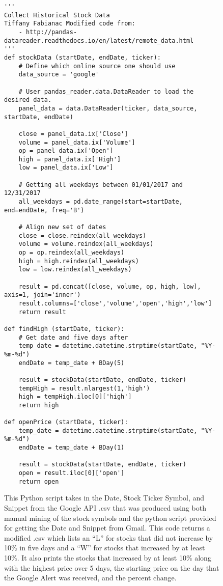 \documentclass[sigconf]{acmart}
\begin{document}
\begin{figure}[htb]
\begin{verbatim}
'''
Collect Historical Stock Data
Tiffany Fabianac Modified code from:
    - http://pandas-datareader.readthedocs.io/en/latest/remote_data.html
'''
def stockData (startDate, endDate, ticker):
	# Define which online source one should use
	data_source = 'google'

	# User pandas_reader.data.DataReader to load the desired data.
	panel_data = data.DataReader(ticker, data_source, startDate, endDate)

	close = panel_data.ix['Close']
	volume = panel_data.ix['Volume']
	op = panel_data.ix['Open']
	high = panel_data.ix['High']
	low = panel_data.ix['Low']

	# Getting all weekdays between 01/01/2017 and 12/31/2017
	all_weekdays = pd.date_range(start=startDate, end=endDate, freq='B')

	# Align new set of dates
	close = close.reindex(all_weekdays)
	volume = volume.reindex(all_weekdays)
	op = op.reindex(all_weekdays)
	high = high.reindex(all_weekdays)
	low = low.reindex(all_weekdays)

	result = pd.concat([close, volume, op, high, low], axis=1, join='inner')
	result.columns=['close','volume','open','high','low']
	return result
	
def findHigh (startDate, ticker):
	# Get date and five days after
	temp_date = datetime.datetime.strptime(startDate, "%Y-%m-%d")
	endDate = temp_date + BDay(5)

	result = stockData(startDate, endDate, ticker)
	tempHigh = result.nlargest(1,'high')
	high = tempHigh.iloc[0]['high']
	return high

def openPrice (startDate, ticker):
	temp_date = datetime.datetime.strptime(startDate, "%Y-%m-%d")
	endDate = temp_date + BDay(1)

	result = stockData(startDate, endDate, ticker)
	open = result.iloc[0]['open']
	return open
\end{verbatim}
\caption{This Python script takes in the Date, Stock Ticker Symbol, and Snippet from the Google API .csv that was produced using both manual mining of the stock symbols and the python script provided for getting the Date and Snippet from Gmail. This code returns a modified .csv which lists an ``L'' for stocks that did not increase by 10\% in five days and a ``W'' for stocks that increased by at least 10\%. It also prints the stocks that increased by at least 10\% along with the highest price over 5 days, the starting price on the day that the Google Alert was received, and the percent change.}\label{c:stock}
\end{figure}
\end{document}
